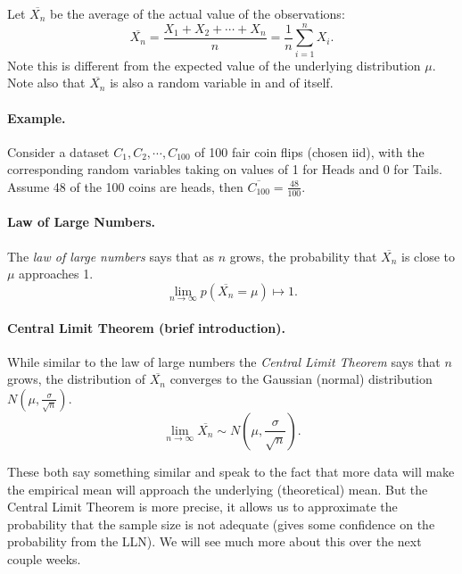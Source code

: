 Let $\overline{X_n}$ be the average of the actual value of the observations:
\[\overline{X_n} = \frac{X_1 + X_2 + \cdots + X_n}{n} = \frac{1}{n} \sum_{i=1}^n X_i.\]
Note this is different from the expected value of the underlying distribution $\mu$.
Note also that $\overline{X_n}$ is also a random variable in and of itself. 

\paragraph{Example. }
Consider a dataset $C_1, C_2,\cdots,C_{100}$ of 100 fair coin flips (chosen iid), with the corresponding random variables 
taking on values of 1 for Heads and 0 for Tails. 
Assume 48 of the 100 coins are heads, then $\overline{C_{100}} = \frac{48}{100}$. 


\paragraph{Law of Large Numbers.} The \emph{law of large numbers} says that as $n$ grows, the probability that $\overline{X_n}$ is close to $\mu$ approaches 1. 
\[\lim_{n\rightarrow\infty} p\left(\overline{X_n}=\mu\right) \mapsto 1.\]

\paragraph{Central Limit Theorem (brief introduction).} While similar to the law of large numbers the \emph{Central Limit Theorem} says that $n$ grows, 
the distribution of $\overline{X_n}$ converges to the Gaussian (normal) distribution $N\left(\mu, \frac{\sigma}{\sqrt{n}}\right)$. 
\[\lim_{n\rightarrow\infty} \overline{X_n} \sim N\left(\mu, \frac{\sigma}{\sqrt{n}}\right).\]

These both say something similar and speak to the fact that more data will make the empirical mean will approach the underlying (theoretical) mean. 
But the Central Limit Theorem is more precise, it allows us to approximate the probability that the sample size is not adequate 
(gives some confidence on the probability from the LLN).
We will see much more about this over the next couple weeks. 


